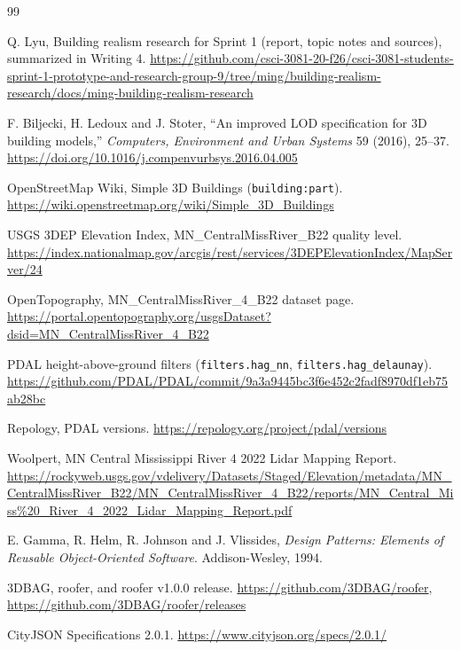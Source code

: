 \documentclass[11pt,letterpaper]{article}
\begin{document}
\begin{thebibliography}{99}
\small
{} %

 Q. Lyu, Building realism research for Sprint 1 (report, topic notes and sources), summarized in Writing 4. \url{https://github.com/csci-3081-20-f26/csci-3081-students-sprint-1-prototype-and-research-group-9/tree/ming/building-realism-research/docs/ming-building-realism-research}

 F. Biljecki, H. Ledoux and J. Stoter, ``An improved LOD specification for 3D building models,'' \emph{Computers, Environment and Urban Systems} 59 (2016), 25--37. \url{https://doi.org/10.1016/j.compenvurbsys.2016.04.005}

 OpenStreetMap Wiki, Simple 3D Buildings (\texttt{building:part}). \url{https://wiki.openstreetmap.org/wiki/Simple_3D_Buildings}

 USGS 3DEP Elevation Index, MN\_CentralMissRiver\_B22 quality level. \url{https://index.nationalmap.gov/arcgis/rest/services/3DEPElevationIndex/MapServer/24}

 OpenTopography, MN\_CentralMissRiver\_4\_B22 dataset page. \url{https://portal.opentopography.org/usgsDataset?dsid=MN_CentralMissRiver_4_B22}

 PDAL height-above-ground filters (\texttt{filters.hag\_nn}, \texttt{filters.hag\_delaunay}). \url{https://github.com/PDAL/PDAL/commit/9a3a9445bc3f6e452c2fadf8970df1eb75ab28bc}

 Repology, PDAL versions. \url{https://repology.org/project/pdal/versions}

 Woolpert, MN Central Mississippi River 4 2022 Lidar Mapping Report. \url{https://rockyweb.usgs.gov/vdelivery/Datasets/Staged/Elevation/metadata/MN_CentralMissRiver_B22/MN_CentralMissRiver_4_B22/reports/MN_Central_Miss%20_River_4_2022_Lidar_Mapping_Report.pdf}

 E. Gamma, R. Helm, R. Johnson and J. Vlissides, \emph{Design Patterns: Elements of Reusable Object-Oriented Software}. Addison-Wesley, 1994.

 3DBAG, roofer, and roofer v1.0.0 release. \url{https://github.com/3DBAG/roofer}, \url{https://github.com/3DBAG/roofer/releases}

 CityJSON Specifications 2.0.1. \url{https://www.cityjson.org/specs/2.0.1/}


\end{thebibliography}
\end{document}
